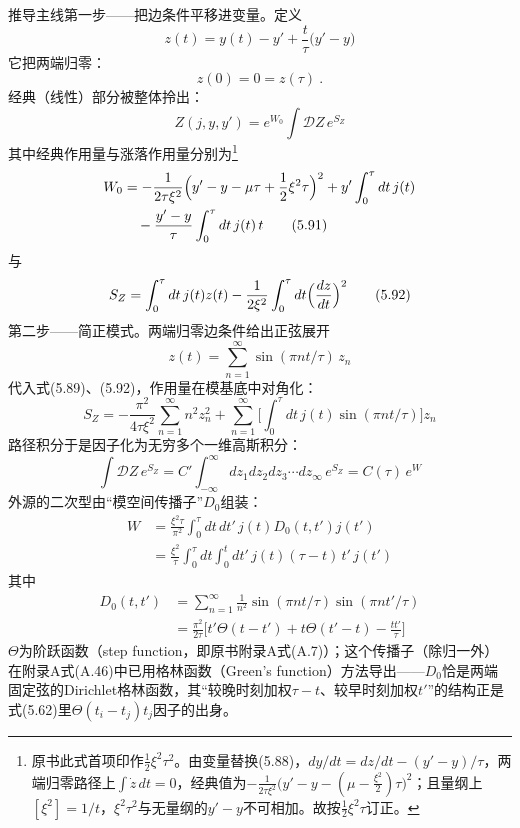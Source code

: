 推导主线第一步——把边条件平移进变量。定义
\begin{equation*}
z(t)=y(t)-y'+\frac{t}{\tau}\bigl(y'-y\bigr)
\tag{5.88}
\end{equation*}
它把两端归零：
\begin{equation*}
z(0)=0=z(\tau)\ .
\tag{5.89}
\end{equation*}
经典（线性）部分被整体拎出：
\begin{equation*}
Z(j,y,y')=e^{W_{0}}\int\mathcal{D}Z\,e^{S_{Z}}
\tag{5.90}
\end{equation*}
其中经典作用量与涨落作用量分别为\footnote{原书此式首项印作$\frac{1}{2}\xi^{2}\tau^{2}$。由变量替换(5.88)，$dy/dt=dz/dt-(y'-y)/\tau$，两端归零路径上$\int\dot z\,dt=0$，经典值为$-\frac{1}{2\tau\xi^{2}}\bigl(y'-y-(\mu-\frac{\xi^{2}}{2})\tau\bigr)^{2}$；且量纲上$[\xi^{2}]=1/t$，$\xi^{2}\tau^{2}$与无量纲的$y'-y$不可相加。故按$\frac{1}{2}\xi^{2}\tau$订正。}
\begin{align*}
W_{0}&=-\frac{1}{2\tau\xi^{2}}
\Bigl(y'-y-\mu\tau+\frac{1}{2}\xi^{2}\tau\Bigr)^{2}
+y'\int_{0}^{\tau}dt\,j(t)\\
&\quad-\frac{y'-y}{\tau}\int_{0}^{\tau}dt\,j(t)\,t
\tag{5.91}
\end{align*}与
\begin{equation*}
S_{Z}=\int_{0}^{\tau}dt\,j(t)z(t)-\frac{1}{2\xi^{2}}
\int_{0}^{\tau}dt\Bigl(\frac{dz}{dt}\Bigr)^{2}
\tag{5.92}
\end{equation*}
第二步——简正模式。两端归零边条件给出正弦展开
\begin{equation*}
z(t)=\sum_{n=1}^{\infty}\sin(\pi nt/\tau)\,z_{n}
\end{equation*}
代入式(5.89)、(5.92)，作用量在模基底中对角化：
\begin{equation*}
S_{Z}=-\frac{\pi^{2}}{4\tau\xi^{2}}\sum_{n=1}^{\infty}n^{2}z_{n}^{2}
+\sum_{n=1}^{\infty}\biggl[\int_{0}^{\tau}dt\,j(t)\sin(\pi nt/\tau)\biggr]z_{n}
\end{equation*}
路径积分于是因子化为无穷多个一维高斯积分：
\begin{equation*}
\int\mathcal{D}Z\,e^{S_{Z}}
=C'\int_{-\infty}^{\infty}dz_1dz_2dz_3\cdots dz_{\infty}\,e^{S_{Z}}
=C(\tau)\,e^{W}
\end{equation*}
外源的二次型由“模空间传播子”$D_0$组装：
\begin{align*}
W&=\frac{\xi^{2}\tau}{\pi^{2}}\int_{0}^{\tau}dt\,dt'\,j(t)D_{0}(t,t')j(t')\\
&=\frac{\xi^{2}}{\tau}\int_{0}^{\tau}dt\int_{0}^{t}dt'\,
j(t)(\tau-t)\,t'\,j(t')
\end{align*}
其中
\begin{align*}
D_{0}(t,t')&=\sum_{n=1}^{\infty}\frac{1}{n^{2}}
\sin(\pi nt/\tau)\sin(\pi nt'/\tau)\\
&=\frac{\pi^{2}}{2\tau}\biggl[t'\Theta(t-t')+t\Theta(t'-t)-\frac{tt'}{\tau}\biggr]
\end{align*}
$\Theta$为阶跃函数（step function，即原书附录A式(A.7)）；这个传播子（除归一外）在附录A式(A.46)中已用格林函数（Green's function）方法导出——$D_0$恰是两端固定弦的Dirichlet格林函数，其“较晚时刻加权$\tau-t$、较早时刻加权$t'$”的结构正是式(5.62)里$\Theta(t_i-t_j)t_j$因子的出身。

